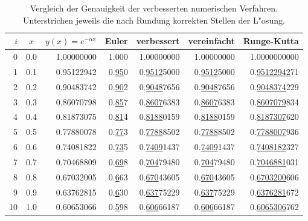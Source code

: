 \begin{table}
\centering
\begin{tabular}{|r|c|r|r|r|r|r|}
\hline
$i$& $x$ & $y(x)=e^{-\alpha x}$&Euler&verbessert&vereinfacht&Runge-Kutta\\
\hline
 0 & 0.0 & 1.00000000 & 1.000 & 1.00000000 & 1.00000000 & 1.0000000000 \\
 1 & 0.1 & 0.95122942 & 0.\underline{95}0 & 0.\underline{9512}5000 & 0.\underline{9512}5000 & 0.\underline{95122942}71 \\
 2 & 0.2 & 0.90483742 & 0.\underline{90}2 & 0.\underline{9048}7656 & 0.\underline{9048}7656 & 0.\underline{9048374}229 \\
 3 & 0.3 & 0.86070798 & 0.\underline{85}7 & 0.\underline{8607}6383 & 0.\underline{8607}6383 & 0.\underline{8607079}834 \\
 4 & 0.4 & 0.81873075 & 0.\underline{81}4 & 0.\underline{8188}0159 & 0.\underline{8188}0159 & 0.\underline{8187307}620 \\
 5 & 0.5 & 0.77880078 & 0.\underline{77}3 & 0.\underline{7788}8502 & 0.\underline{7788}8502 & 0.\underline{7788007}936 \\
 6 & 0.6 & 0.74081822 & 0.\underline{73}5 & 0.\underline{7409}1437 & 0.\underline{7409}1437 & 0.\underline{7408182}327 \\
 7 & 0.7 & 0.70468809 & 0.\underline{69}8 & 0.\underline{704}79480 & 0.\underline{704}79480 & 0.\underline{7046881}031 \\
 8 & 0.8 & 0.67032005 & 0.\underline{6}63 & 0.\underline{670}43605 & 0.\underline{670}43605 & 0.\underline{6703200}606 \\
 9 & 0.9 & 0.63762815 & 0.\underline{6}30 & 0.\underline{637}75229 & 0.\underline{637}75229 & 0.\underline{6376281}672 \\
10 & 1.0 & 0.60653066 & 0.\underline{5}98 & 0.\underline{606}66187 & 0.\underline{606}66187 & 0.\underline{6065306}762 \\
\hline
\end{tabular}
\caption{Vergleich der Genauigkeit der verbesserten numerischen Verfahren.
Unterstrichen jeweils die nach Rundung korrekten Stellen der L"osung.
\label{numerik:genauigkeit}}
\end{table}


